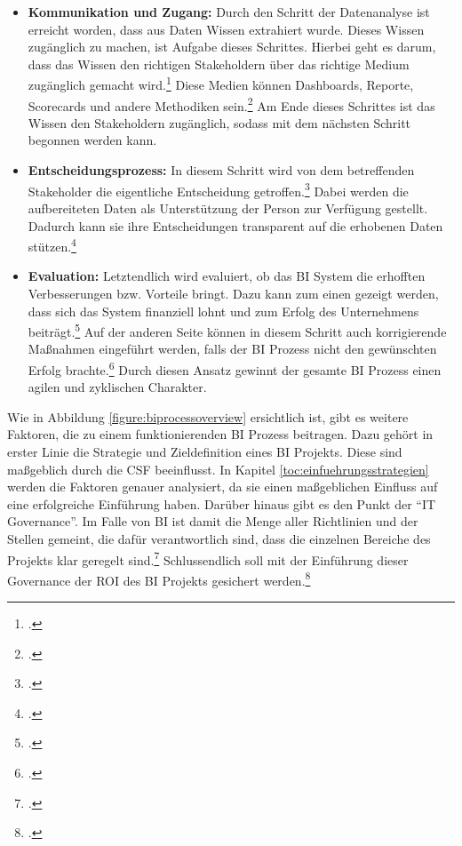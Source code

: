\begin{itemize}
    der Betrieb von Simulationen (beispielsweise Monte-Carlo Simulationen) in diesem Schritt möglich. Letztendlich wird am
    Schluss dieses Schrittes als Ergebnis der Analysen und Berechnungen dem Management Wissen geboten, das gerade in Hinsicht
    auf Entscheidungsprozesse einen Vorteil gegenüber Konkurrenten bietet.\footcite[Cf.][p. 94]{hovcevar2010assessing}
    \item \textbf{Kommunikation und Zugang: }Durch den Schritt der Datenanalyse ist erreicht worden, dass aus Daten Wissen
    extrahiert wurde. Dieses Wissen zugänglich zu machen, ist Aufgabe dieses Schrittes. Hierbei geht es darum, dass das Wissen
    den richtigen Stakeholdern über das richtige Medium zugänglich gemacht wird.\footcite[Cf.][p. 11]{foley2010business} Diese
    Medien können Dashboards, Reporte, Scorecards und andere Methodiken sein.\footcite[Cf.][p. 21ff]{niu2009cognition} Am Ende
    dieses Schrittes ist das Wissen den Stakeholdern zugänglich, sodass mit dem nächsten Schritt begonnen werden kann.
    \item \textbf{Entscheidungsprozess: }In diesem Schritt wird von dem betreffenden Stakeholder die eigentliche Entscheidung
    getroffen.\footcite[Cf.][p. 12]{foley2010business} Dabei werden die aufbereiteten Daten als Unterstützung der Person zur
    Verfügung gestellt. Dadurch kann sie ihre Entscheidungen transparent auf die erhobenen Daten
    stützen.\footcite[Cf.][p. 13]{kasemsap2016fundamentals}
    \item \textbf{Evaluation: }Letztendlich wird evaluiert, ob das \ac{BI} System die erhofften Verbesserungen bzw. Vorteile
    bringt. Dazu kann zum einen gezeigt werden, dass sich das System finanziell lohnt und zum Erfolg des Unternehmens
    beiträgt.\footcite[Cf.][p. 12]{foley2010business} Auf der anderen Seite können in diesem Schritt auch korrigierende
    Maßnahmen eingeführt werden, falls der \ac{BI} Prozess nicht den gewünschten Erfolg brachte.\footcite[Cf.][p. 12]{foley2010business}
    Durch diesen Ansatz gewinnt der gesamte \ac{BI} Prozess einen agilen und zyklischen Charakter.
\end{itemize}

Wie in Abbildung \ref{figure:biprocessoverview} ersichtlich ist, gibt es weitere Faktoren, die zu einem funktionierenden
\ac{BI} Prozess beitragen. Dazu gehört in erster Linie die Strategie und Zieldefinition eines BI Projekts. Diese sind maßgeblich
durch die \ac{CSF} beeinflusst. In Kapitel \ref{toc:einfuehrungsstrategien} werden die Faktoren genauer analysiert, da sie
einen maßgeblichen Einfluss auf eine erfolgreiche Einführung haben. Darüber hinaus gibt es den Punkt der "`IT Governance"'.
Im Falle von \ac{BI} ist damit die Menge aller Richtlinien und der Stellen gemeint, die dafür verantwortlich sind, dass die
einzelnen Bereiche des Projekts klar geregelt sind.\footcite[Cf.][p. 8]{foley2010business} Schlussendlich soll mit
der Einführung dieser Governance der \ac{ROI} des \ac{BI} Projekts gesichert werden.\footcite[Cf.][p. 8]{foley2010business}

